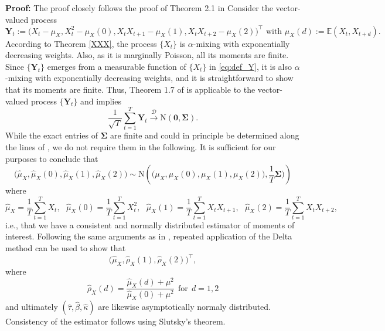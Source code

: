 \documentclass{article}
\begin{document}
\textbf{Proof:} The proof closely follows the proof of Theorem 2.1 in \cite{Weiss2016} Consider the vector-valued process
\begin{equation}
\mathbf{Y}_t := \big(X_t - \mu_X, X^2_t - \mu_X(0), X_t X_{t + 1} - \mu_X(1) , X_t X_{t + 2} - \mu_X(2)\big)^\top \text{ with } \mu_X(d):= \mathbb{E}(X_t, X_{t + d}).\label{eq:def_Y}
\end{equation}
According to Theorem \ref{XXX}, the process $\{X_t\}$ is $ \alpha$-mixing with exponentially decreasing weights. Also, as it is marginally Poisson, all its moments are finite. Since $\{\mathbf{Y}_t\}$ emerges from a measurable function of $\{X_t\}$ in \eqref{eq:def_Y}, it is also $\alpha$-mixing with exponentially decreasing weights, and it is straightforward to show that its moments are finite. Thus, Theorem 1.7 of \cite{Ibragimov1962} is applicable to the vector-valued process $\{\mathbf{Y}_t\}$ and implies
$$
\frac{1}{\sqrt{T}} \sum_{t = 1}^T \mathbf{Y}_t \stackrel{\mathcal{D}}{\longrightarrow} \text{N}(\mathbf{0}, \mathbf{\Sigma}).
$$
While the exact entries of $\mathbf{\Sigma}$ are finite and could in principle be determined along the lines of \cite{Weiss2016}, we do not require them in the following. It is sufficient for our purposes to conclude that
$$
\big(\hat{\mu}_X, \hat{\mu}_X(0), \hat{\mu}_X(1), \hat{\mu}_X(2)\big) \sim \text{N}\left(\big(\mu_X, \mu_X(0), \mu_X(1), \mu_X(2)\big), \frac{1}{T}\mathbf{\Sigma})\right)
$$
where
$$
\hat{\mu}_X = \frac{1}{T} \sum_{t = 1}^T X_t,\ \ \ \hat{\mu}_X(0) = \frac{1}{T} \sum_{t = 1}^T X^2_t, \ \ \ \hat{\mu}_X(1) = \frac{1}{T} \sum_{t = 1}^T X_tX_{t + 1}, \ \ \ \hat{\mu}_X(2) = \frac{1}{T} \sum_{t = 1}^T X_tX_{t + 2},
$$
i.e., that we have a consistent and normally distributed estimator of moments of interest. Following the same arguments as in \cite{Weiss2016}, repeated application of the Delta method can be used to show that
$$
\big(\hat{\mu}_X, \hat{\rho}_X(1), \hat{\rho}_X(2)\big)^\top,
$$
where
$$
\hat{\rho}_X(d) = \frac{\hat{\mu}_X(d) + \mu^2}{\hat{\mu}_X(0) + \mu^2} \ \ \text{for} \ \ d = 1, 2
$$
and ultimately $(\hat{\tau}, \hat{\beta}, \hat{\kappa})$ are likewise asymptotically normaly distributed. Consistency of the estimator follows using Slutsky's theorem.
\end{document}
